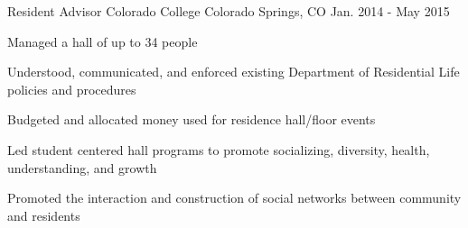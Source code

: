 \begin{cventries}

\vspace{-1.25em}
\cventry
{Resident Advisor} %
{Colorado College} %
{Colorado Springs, CO} %
{Jan. 2014 - May 2015} %
{ %
\begin{cvitems}
\item {Managed a hall of up to 34 people}
\item {Understood, communicated, and enforced existing Department of Residential Life policies and procedures}
\item{Budgeted and allocated money used for residence hall/floor events}
\item{Led student centered hall programs to promote socializing, diversity, health, understanding, and growth}
\item{Promoted the interaction and construction of social networks between community and residents}
\end{cvitems} 
}






\end{cventries}
